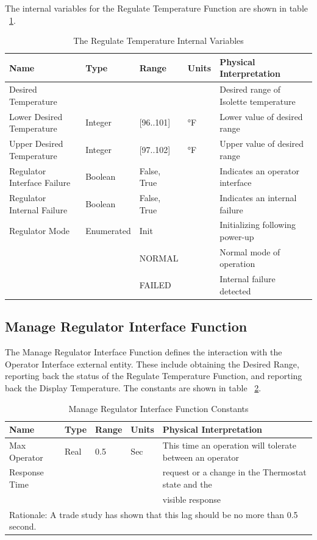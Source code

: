 The internal variables for the Regulate Temperature Function are shown in table ~\ref{tab:internal-variables}.

\begin{table}
\begin{tabular}{|l|l|l|l|l|}
\hline
Name & Type & Range & Units & Physical Interpretation \\\hline
Desired Temperature &  &  &  & Desired range of Isolette temperature \\\hline
Lower Desired Temperature & Integer & [96..101] & °F & Lower value of desired range \\\hline
Upper Desired Temperature & Integer & [97..102] & °F & Upper value of desired range \\\hline
Regulator Interface Failure & Boolean & False, True &  & Indicates an operator interface \\\hline
Regulator Internal Failure & Boolean & False, True &  & Indicates an internal failure \\\hline
Regulator Mode & Enumerated & Init &  & Initializing following power-up \\\cline{3-5}
  &  & NORMAL &  & Normal mode of operation \\\cline{3-5}
  &  & FAILED &  & Internal failure detected \\\hline
\end{tabular}
\caption{The Regulate Temperature Internal Variables}
\label{tab:internal-variables}
\end{table}

\subsection{Manage Regulator Interface Function}
\label{subsec:MRI-fun}

The Manage Regulator Interface Function defines the interaction with the Operator Interface
external entity. These include obtaining the Desired Range, reporting back the status of the
Regulate Temperature Function, and reporting back the Display Temperature. The constants are
shown in table ~\ref{tab:MRI-fun-constants}.

\begin{table}
\begin{tabular}{|l|l|l|l|l|}
\hline
Name & Type & Range & Units & Physical Interpretation \\\hline
Max Operator & Real & 0.5 & Sec & This time an operation will tolerate between an operator \\
Response Time &  &  &  & request or a change in the Thermostat state and the \\
  &  &  &  & visible response \\\hline
\multicolumn{5}{|l|}{Rationale: A trade study has shown that this lag should be no more than 0.5 second.} \\\hline
\end{tabular}
\caption{Manage Regulator Interface Function Constants}
\label{tab:MRI-fun-constants}
\end{table}


